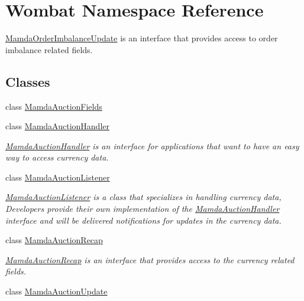 \hypertarget{namespaceWombat}{
\section{Wombat Namespace Reference}
\label{namespaceWombat}
}
\hyperlink{classWombat_1_1MamdaOrderImbalanceUpdate}{Mamda\-Order\-Imbalance\-Update} is an interface that provides access to order imbalance related fields.  


\subsection*{Classes}
\begin{CompactItemize}
\item 
class \hyperlink{classWombat_1_1MamdaAuctionFields}{Mamda\-Auction\-Fields}
\item 
class \hyperlink{classWombat_1_1MamdaAuctionHandler}{Mamda\-Auction\-Handler}
\begin{CompactList}\small\item\em \hyperlink{classWombat_1_1MamdaAuctionHandler}{Mamda\-Auction\-Handler} is an interface for applications that want to have an easy way to access currency data. \item\end{CompactList}\item 
class \hyperlink{classWombat_1_1MamdaAuctionListener}{Mamda\-Auction\-Listener}
\begin{CompactList}\small\item\em \hyperlink{classWombat_1_1MamdaAuctionListener}{Mamda\-Auction\-Listener} is a class that specializes in handling currency data, Developers provide their own implementation of the \hyperlink{classWombat_1_1MamdaAuctionHandler}{Mamda\-Auction\-Handler} interface and will be delivered notifications for updates in the currency data. \item\end{CompactList}\item 
class \hyperlink{classWombat_1_1MamdaAuctionRecap}{Mamda\-Auction\-Recap}
\begin{CompactList}\small\item\em \hyperlink{classWombat_1_1MamdaAuctionRecap}{Mamda\-Auction\-Recap} is an interface that provides access to the currency related fields. \item\end{CompactList}\item 
class \hyperlink{classWombat_1_1MamdaAuctionUpdate}{Mamda\-Auction\-Update}

\end{CompactItemize}
